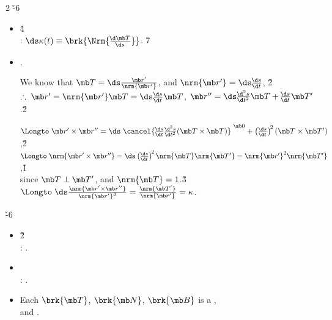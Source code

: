 \documentclass[dvipdfmx,a4paper,titlepage,9pt]{jsarticle}
\begin{document}
\begin{multicols*}{2}
\v{-6}
\begin{itemize}[label={-}]
\item{} \v4\\
: $\ds\kappa(t)\equiv\brk{\Nrm{\frac{\!\d\mb T}{\!\d s}}}$. \v7 \\

\item {}.
\begin{Pfbox}
We know that $\mb T=\ds\frac{\mb r'}{\nrm{\mb r'}}$, and $\nrm{\mb r'}=\ds\frac{\!\d s}{\!\d t}$, \v2\\
$\therefore\;\mb r'=\nrm{\mb r'}\mb T=\ds\frac{\!\d s}{\!\d t}\mb T$, \;$\mb r''=\ds\frac{\!\d^2 s}{\!\d t^2}\mb T+\frac{\!\d s}{\!\d t}\mb T'$.\v2

$\Longto\;\mb r'\times\mb r''=\ds\left.\cancel{\frac{\!\d s}{\!\d t}\frac{\!\d^2 s}{\!\d t^2}(\mb T\times\mb T)}\right.^{\,\mb0}+\left(\frac{\!\d s}{\!\d t}\right)^{\!2}(\mb T\times\mb T')$,\v2\\
$\Longto\;\nrm{\mb r'\times\mb r''}=\ds\left(\frac{\!\d s}{\!\d t}\right)^{\!2}\nrm{\mb T}\nrm{\mb T'}=\nrm{\mb r'}^2\nrm{\mb T'}$,\v1\\
\qquad since $\mb T\perp\mb T'$, and $\nrm{\mb T}=1$.\v3\\
$\Longto\;\ds\frac{\nrm{\mb r'\times\mb r''}}{\nrm{\mb r'}^3}=\frac{\nrm{\mb T'}}{\nrm{\mb r'}}=\kappa$.
\end{Pfbox}
\end{itemize}

\newpage

\v{-6}
\begin{itemize}[label={-}]
\item{}\v2\\
: . \\

\item{}\\
: .\\

\item Each $\brk{\mb T}$, $\brk{\mb N}$, $\brk{\mb B}$ is a , \\
and . \\


\end{itemize}
\end{multicols*}
\end{document}
